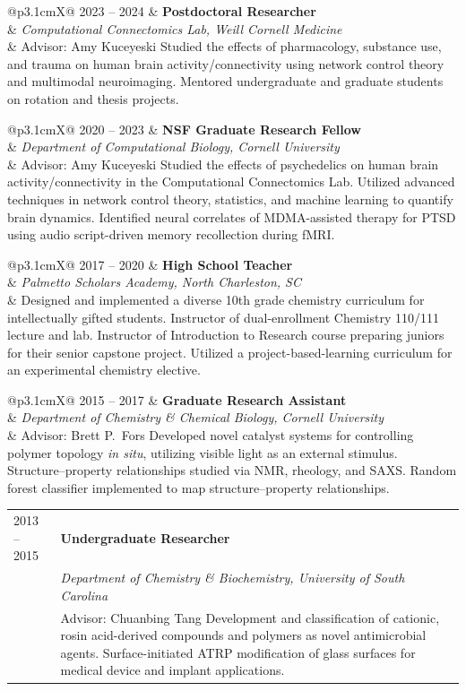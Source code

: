 \documentclass[11pt, letterpaper]{article}
\makeatletter
\newcommand{\entry}[4]{%
  \noindent
  \begin{tabularx}{\linewidth}{@{}p{3.1cm}X@{}}
    \textcolor{light}{\small #1} &
    \textbf{#2} \\
    & \textit{#3} \\
    & #4
  \end{tabularx}
  \vspace{0.4em}
}
\makeatother
\begin{document}
\entry{2023 -- 2024}
  {Postdoctoral Researcher}
  {Computational Connectomics Lab, Weill Cornell Medicine}
  {Advisor: Amy Kuceyeski \newline
   Studied the effects of pharmacology, substance use, and trauma on human brain activity/connectivity using network control theory and multimodal neuroimaging. \newline
   Mentored undergraduate and graduate students on rotation and thesis projects.}

\entry{2020 -- 2023}
  {NSF Graduate Research Fellow}
  {Department of Computational Biology, Cornell University}
  {Advisor: Amy Kuceyeski \newline
   Studied the effects of psychedelics on human brain activity/connectivity in the Computational Connectomics Lab. \newline
   Utilized advanced techniques in network control theory, statistics, and machine learning to quantify brain dynamics. \newline
   Identified neural correlates of MDMA-assisted therapy for PTSD using audio script-driven memory recollection during fMRI.}

\entry{2017 -- 2020}
  {High School Teacher}
  {Palmetto Scholars Academy, North Charleston, SC}
  {Designed and implemented a diverse 10th grade chemistry curriculum for intellectually gifted students. \newline
   Instructor of dual-enrollment Chemistry 110/111 lecture and lab. \newline
   Instructor of Introduction to Research course preparing juniors for their senior capstone project. \newline
   Utilized a project-based-learning curriculum for an experimental chemistry elective.}

\entry{2015 -- 2017}
  {Graduate Research Assistant}
  {Department of Chemistry \& Chemical Biology, Cornell University}
  {Advisor: Brett P.\ Fors \newline
   Developed novel catalyst systems for controlling polymer topology \textit{in situ}, utilizing visible light as an external stimulus. \newline
   Structure--property relationships studied via NMR, rheology, and SAXS. \newline
   Random forest classifier implemented to map structure--property relationships.}

\entry{2013 -- 2015}
  {Undergraduate Researcher}
  {Department of Chemistry \& Biochemistry, University of South Carolina}
  {Advisor: Chuanbing Tang \newline
   Development and classification of cationic, rosin acid-derived compounds and polymers as novel antimicrobial agents. \newline
   Surface-initiated ATRP modification of glass surfaces for medical device and implant applications.}
\end{document}
